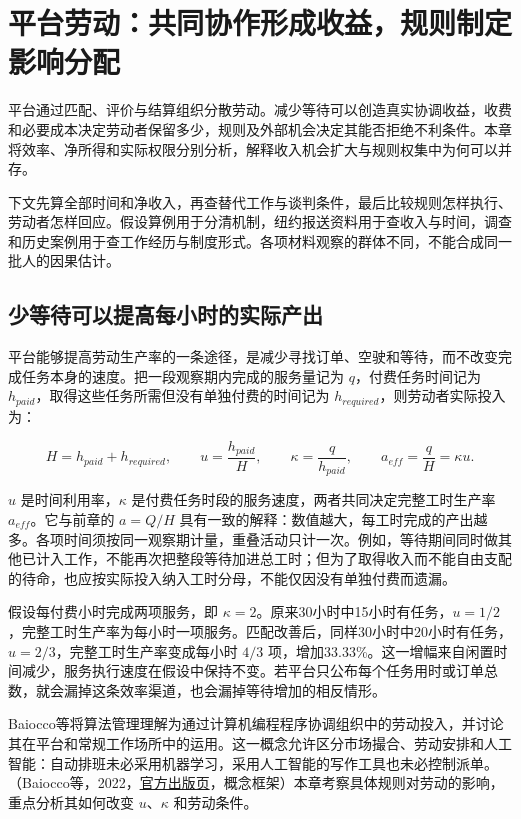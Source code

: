 \documentclass[UTF8,fontset=windows,12pt,a4paper,oneside,openany]{ctexbook}
\begin{document}
\chapter{平台劳动：共同协作形成收益，规则制定影响分配}\label{ch:6}

平台通过匹配、评价与结算组织分散劳动。减少等待可以创造真实协调收益，收费和必要成本决定劳动者保留多少，规则及外部机会决定其能否拒绝不利条件。本章将效率、净所得和实际权限分别分析，解释收入机会扩大与规则权集中为何可以并存。

下文先算全部时间和净收入，再查替代工作与谈判条件，最后比较规则怎样执行、劳动者怎样回应。假设算例用于分清机制，纽约报送资料用于查收入与时间，调查和历史案例用于查工作经历与制度形式。各项材料观察的群体不同，不能合成同一批人的因果估计。

\section{少等待可以提高每小时的实际产出}

平台能够提高劳动生产率的一条途径，是减少寻找订单、空驶和等待，而不改变完成任务本身的速度。把一段观察期内完成的服务量记为 $q$，付费任务时间记为 $h_{paid}$，取得这些任务所需但没有单独付费的时间记为 $h_{required}$，则劳动者实际投入为：

\[
H=h_{paid}+h_{required},\qquad
u=\frac{h_{paid}}{H},\qquad
\kappa=\frac{q}{h_{paid}},\qquad
a_{eff}=\frac{q}{H}=\kappa u.
\]

$u$ 是时间利用率，$\kappa$ 是付费任务时段的服务速度，两者共同决定完整工时生产率 $a_{eff}$。它与前章的 $a=Q/H$ 具有一致的解释：数值越大，每工时完成的产出越多。各项时间须按同一观察期计量，重叠活动只计一次。例如，等待期间同时做其他已计入工作，不能再次把整段等待加进总工时；但为了取得收入而不能自由支配的待命，也应按实际投入纳入工时分母，不能仅因没有单独付费而遗漏。

假设每付费小时完成两项服务，即 $\kappa=2$。原来30小时中15小时有任务，$u=1/2$，完整工时生产率为每小时一项服务。匹配改善后，同样30小时中20小时有任务，$u=2/3$，完整工时生产率变成每小时 $4/3$ 项，增加33.33\%。这一增幅来自闲置时间减少，服务执行速度在假设中保持不变。若平台只公布每个任务用时或订单总数，就会漏掉这条效率渠道，也会漏掉等待增加的相反情形。

Baiocco等将算法管理理解为通过计算机编程程序协调组织中的劳动投入，并讨论其在平台和常规工作场所中的运用。这一概念允许区分市场撮合、劳动安排和人工智能：自动排班未必采用机器学习，采用人工智能的写作工具也未必控制派单。（Baiocco等，2022，\href{https://www.ilo.org/publications/algorithmic-management-work-and-its-implications-different-contexts}{官方出版页}，概念框架）本章考察具体规则对劳动的影响，重点分析其如何改变 $u$、$\kappa$ 和劳动条件。
\end{document}
